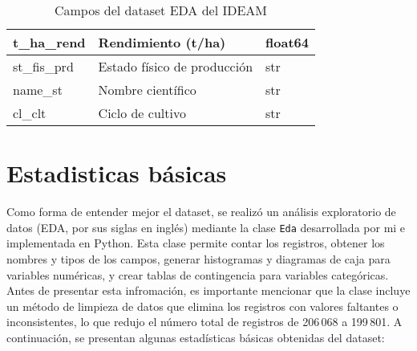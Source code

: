 \documentclass[12pt,a4paper]{article}
\begin{document}
\begin{table}[]
\begin{tabular}{|l|l|l|}
        t\_ha\_rend                                 & Rendimiento (t/ha)                            & float64                            \\ \hline
        st\_fis\_prd                                & Estado físico de producción                   & str                                \\ \hline
        name\_st                                    & Nombre científico                             & str                                \\ \hline
        cl\_clt                                     & Ciclo de cultivo                              & str                                \\ \hline
    \end{tabular}
    \caption{Campos del dataset EDA del IDEAM}
    \label{tab:campos}
\end{table}

% 
\section{Estadisticas básicas}
Como forma de entender mejor el dataset, se realizó un análisis exploratorio de datos (EDA, por sus siglas en inglés)
mediante la clase \texttt{Eda} desarrollada por mi e implementada en Python. Esta clase permite contar los registros, 
obtener los nombres y tipos de los campos, generar histogramas y diagramas de caja para variables numéricas,
y crear tablas de contingencia para variables categóricas. Antes de presentar esta infromación, es importante mencionar 
que la clase incluye un método de limpieza de datos que elimina los registros con valores faltantes o inconsistentes, lo
que redujo el número total de registros de 206\,068 a 199\,801. A continuación, se presentan algunas estadísticas básicas 
obtenidas del dataset:
\end{document}
